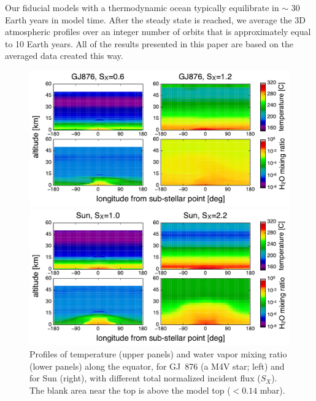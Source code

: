 \documentclass[11pt,numberedappendix,twocolappendix,]{emulateapj}
\def\wv{water vapor}
\begin{document}
Our fiducial models with a thermodynamic ocean typically equilibrate in $\sim $ 30 Earth years in model time. 
After the steady state is reached, we average the 3D atmospheric profiles over an integer number of orbits that is approximately equal to 10 Earth years. 
All of the results presented in this paper are based on the averaged data created this way. 


\begin{figure}[tb]
    \begin{minipage}{0.5\hsize}
\includegraphics[width=\hsize]{AqOH0TLS_GJ876_temp_xH2O.pdf}
    \end{minipage}
    \begin{minipage}{0.5\hsize}
\includegraphics[width=\hsize]{AqOH0TLS_Sun_temp_xH2O.pdf}
    \end{minipage}
    \caption{Profiles of temperature (upper panels) and \wv{} mixing ratio (lower panels) along the equator, for GJ~876 (a M4V star; left) and for Sun (right), with different total normalized incident flux ($S_X$). The blank area near the top is above the model top ($< 0.14$ mbar).}
\label{fig:3Dprofile_equator}
\end{figure}
\end{document}

